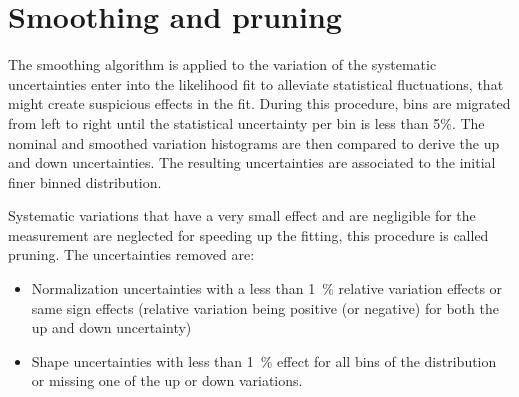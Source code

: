\section{Smoothing and pruning}
The smoothing algorithm is applied to the variation of the systematic uncertainties enter into the likelihood fit to alleviate statistical fluctuations, that might create suspicious effects in the fit.
During this procedure, bins are migrated from left to right until the statistical uncertainty per bin is less than 5$\%$. The nominal and smoothed variation histograms are then compared to derive the up and down uncertainties. The resulting uncertainties are associated to the initial finer binned distribution. 

Systematic variations that have a very small effect and are negligible for the measurement are neglected for speeding up the fitting, this procedure is called pruning. 
The uncertainties removed are:
  \begin{itemize}
   \item  Normalization uncertainties with a less than 1~$\%$ relative variation effects or same sign effects (relative variation being positive (or negative) for both the up and down uncertainty)
   \item  Shape uncertainties with less than 1~$\%$ effect for all bins of the distribution or missing one of the up or down variations.
    \end{itemize}



